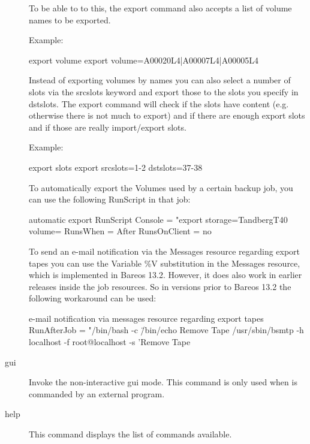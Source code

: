 \begin{description}
   To be able to to this, the export command also accepts a list of volume names
   to be exported.

   Example:

\begin{bconsole}{export volume}
export volume=A00020L4|A00007L4|A00005L4
\end{bconsole}

   Instead of exporting volumes by names you can also select a number of slots via
   the srcslots keyword and export those to the slots you specify in dstslots. The export
   command will check if the slots have content (e.g. otherwise there is not much to
   export) and if there are enough export slots and if those are really import/export slots.

   Example:

\begin{bconsole}{export slots}
export srcslots=1-2 dstslots=37-38
\end{bconsole}

   To automatically export the Volumes used by a certain backup job, you can use the following RunScript in that job:

\begin{bconsole}{automatic export}
RunScript {
    Console = "export storage=TandbergT40 volume=%
    RunsWhen = After
    RunsOnClient = no
}
\end{bconsole}

  To send an e-mail notification via the Messages resource regarding export tapes you can use the Variable \%V substitution in the Messages resource, which is implemented in Bareos 13.2. However, it does also work in earlier releases inside the job resources. So in versions prior to Bareos 13.2 the following workaround can be used:

\begin{bconsole}{e-mail notification via messages resource regarding export tapes}
RunAfterJob = "/bin/bash -c \"/bin/echo Remove Tape %
/usr/sbin/bsmtp -h localhost -f root@localhost -s 'Remove Tape %
\end{bconsole}


\item [gui]
    Invoke the non-interactive gui mode.
    This command is only used when  is commanded by an external program.

\item [help]
   This command displays the list of commands available.


\end{description}

